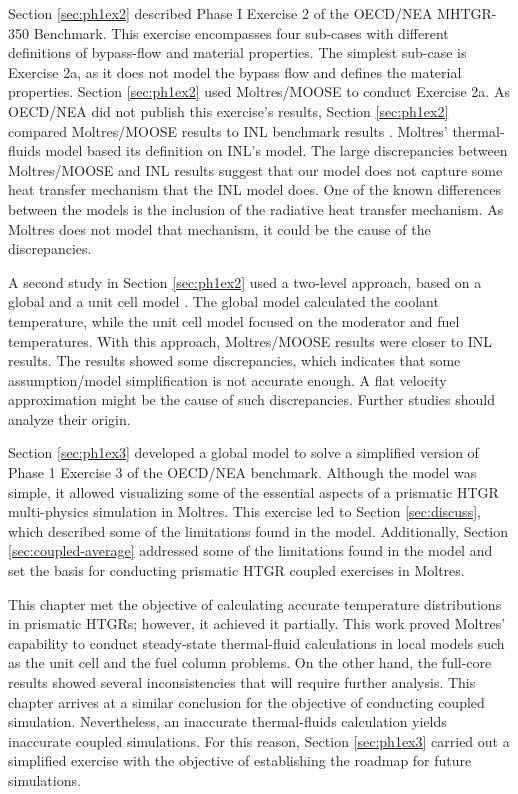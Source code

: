 Section \ref{sec:ph1ex2} described Phase I Exercise 2 of the OECD/NEA MHTGR-350 Benchmark.
This exercise encompasses four sub-cases with different definitions of bypass-flow and material properties.
The simplest sub-case is Exercise 2a, as it does not model the bypass flow and defines the material properties.
Section \ref{sec:ph1ex2} used Moltres/MOOSE to conduct Exercise 2a.
As OECD/NEA did not publish this exercise’s results, Section \ref{sec:ph1ex2} compared Moltres/MOOSE results to INL benchmark results \cite{strydom_inl_2013}.
Moltres' thermal-fluids model based its definition on INL's model.
The large discrepancies between Moltres/MOOSE and INL results suggest that our model does not capture some heat transfer mechanism that the INL model does.
One of the known differences between the models is the inclusion of the radiative heat transfer mechanism.
As Moltres does not model that mechanism, it could be the cause of the discrepancies.

A second study in Section \ref{sec:ph1ex2} used a two-level approach, based on a global and a unit cell model \cite{stainsby_investigation_2008}.
The global model calculated the coolant temperature, while the unit cell model focused on the moderator and fuel temperatures.
With this approach, Moltres/MOOSE results were closer to INL results.
The results showed some discrepancies, which indicates that some assumption/model simplification is not accurate enough.
A flat velocity approximation might be the cause of such discrepancies.
Further studies should analyze their origin.

Section \ref{sec:ph1ex3} developed a global model to solve a simplified version of Phase 1 Exercise 3 of the OECD/NEA benchmark.
Although the model was simple, it allowed visualizing some of the essential aspects of a prismatic HTGR multi-physics simulation in Moltres.
This exercise led to Section \ref{sec:discuss}, which described some of the limitations found in the model.
Additionally, Section \ref{sec:coupled-average} addressed some of the limitations found in the model and set the basis for conducting prismatic HTGR coupled exercises in Moltres.

This chapter met the objective of calculating accurate temperature distributions in prismatic HTGRs; however, it achieved it partially.
This work proved Moltres' capability to conduct steady-state thermal-fluid calculations in local models such as the unit cell and the fuel column problems.
On the other hand, the full-core results showed several inconsistencies that will require further analysis.
This chapter arrives at a similar conclusion for the objective of conducting coupled simulation.
Nevertheless, an inaccurate thermal-fluids calculation yields inaccurate coupled simulations.
For this reason, Section \ref{sec:ph1ex3} carried out a simplified exercise with the objective of establishing the roadmap for future simulations.
